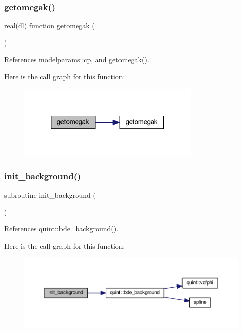 \subsubsection{\texorpdfstring{getomegak()}{getomegak()}}
{\footnotesize\ttfamily real(dl) function getomegak (\begin{DoxyParamCaption}{ }\end{DoxyParamCaption})}



References modelparams\+::cp, and getomegak().

Here is the call graph for this function\+:
\nopagebreak
\begin{figure}[H]
\begin{center}
\leavevmode
\includegraphics[width=248pt]{equations__bde__v3__original_8f90_a2c95a3b42a68aa87a21097ce3ff8bbe6_cgraph}
\end{center}
\end{figure}
\mbox{\label{equations__bde__v3__original_8f90_a47540f6082acc64c78a1daac45637fd6}} 
\subsubsection{\texorpdfstring{init\+\_\+background()}{init\_background()}}
{\footnotesize\ttfamily subroutine init\+\_\+background (\begin{DoxyParamCaption}{ }\end{DoxyParamCaption})}



References quint\+::bde\+\_\+background().

Here is the call graph for this function\+:
\nopagebreak
\begin{figure}[H]
\begin{center}
\leavevmode
\includegraphics[width=350pt]{equations__bde__v3__original_8f90_a47540f6082acc64c78a1daac45637fd6_cgraph}
\end{center}
\end{figure}
